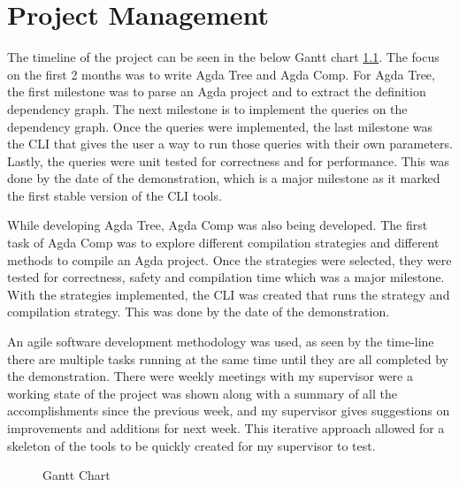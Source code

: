 
\chapter{Project Management}

The timeline of the project can be seen in the below Gantt chart
\cref{fig:Gantt}. The focus on the first 2 months was to write Agda Tree and
Agda Comp. For Agda Tree, the first milestone was to parse an Agda project and to
extract the definition dependency graph. The next milestone is to implement the
queries on the dependency graph. Once the queries were implemented,
the last milestone was the CLI that gives the user a
way to run those queries with their own parameters. Lastly, the queries were
unit tested for correctness and for performance. This was done by the
date of the demonstration, which is a major milestone as it marked the first
stable version of the CLI tools.

While developing Agda Tree, Agda Comp was also being developed. The first task
of Agda Comp was to explore different compilation strategies and different
methods to compile an Agda project. Once the strategies were selected, they
were tested for correctness, safety and compilation time which was a major
milestone. With the strategies implemented, the CLI was created that
runs the strategy and compilation strategy. This was done by the date
of the demonstration.

An agile software development methodology was used, as seen by the time-line
there are multiple tasks running at the same time until they are all completed
by the demonstration. There were weekly meetings with my supervisor were a
working state of the project was shown along with a summary of all the
accomplishments since the previous week, and my supervisor gives suggestions on
improvements and additions for next week. This iterative approach allowed for
a skeleton of the tools to be quickly created for my supervisor to test.

\begin{figure}[H]
    \centering
    \label{fig:Gantt}
    \caption{Gantt Chart}
\end{figure} 


